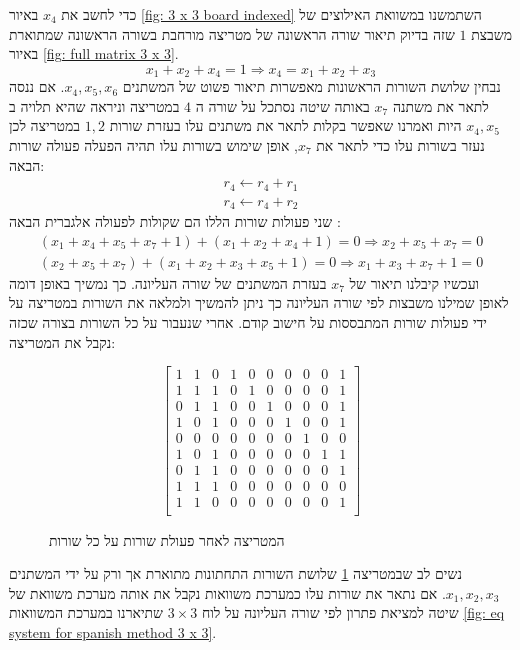 \documentclass[12pt,leqno]{article}
\begin{document}
כדי לחשב את 
$x_4$
באיור
\ref{fig: 3 x 3 board indexed}
השתמשנו במשוואת האילוצים של 
משבצת 
$1$
שזה בדיוק תיאור
שורה הראשונה של 
מטריצה מורחבת 
בשורה הראשונה
שמתוארת
באיור 
\ref{fig: full matrix 3 x 3}.
\[
    x_1 + x_2 + x_4 = 1 \Rightarrow x_4 = x_1 + x_2 + x_3
\]
נבחין שלושת השורות הראשונות  
מאפשרות תיאור פשוט של המשתנים 
$x_4, x_5, x_6$.
אם ננסה לתאר 
את משתנה 
$x_7$
באותה שיטה 
נסתכל על שורה ה 
$4$
במטריצה 
וניראה שהיא תלויה ב
$x_4, x_5$
היות ואמרנו
שאפשר בקלות לתאר את משתנים עלו 
בעזרת שורות 
$1,2$
במטריצה לכן 
נעזר בשורות עלו כדי לתאר את 
$x_7$,
אופן שימוש בשורות עלו תהיה 
הפעלה פעולה שורות הבאה:
\begin{align*}
    r_4 \leftarrow r_4 + r_1
    \\
    r_4 \leftarrow r_4 + r_2
\end{align*}
שני פעולות שורות הללו הם שקולות לפעולה אלגברית הבאה
:
\begin{align*}
   (x_1 + x_4 + x_5 + x_7 + 1) + (x_1 + x_2 + x_4 + 1) = 0 \Rightarrow x_2 + x_5 + x_7 = 0
    \\
    (x_2 + x_5 + x_7) + (x_1 + x_2 + x_3 + x_5 + 1 ) = 0 \Rightarrow x_1 + x_3 + x_7 + 1 = 0
\end{align*}
ועכשיו קיבלנו תיאור 
של 
$x_7$
בעזרת המשתנים של שורה העליונה.
כך נמשיך באופן דומה לאופן שמילנו משבצות לפי שורה העליונה כך ניתן 
להמשיך ולמלאה את השורות במטריצה על ידי פעולות שורות המתבססות על 
חישוב קודם.
אחרי שנעבור על כל השורות בצורה שכזה נקבל את המטריצה:
\begin{figure}
    \caption{המטריצה לאחר פעולת שורות על כל שורות}
    \label{fig: matrix after spanish}
    \begin{english}
        \begin{center}
            \[
                \left[
                \begin{array}{ccccccccc|c}
                1& 1& 0& 1& 0& 0& 0& 0& 0& 1 \\
                1& 1& 1& 0& 1& 0& 0& 0& 0& 1 \\
                0& 1& 1& 0& 0& 1& 0& 0& 0& 1 \\
                1& 0& 1& 0& 0& 0& 1& 0& 0& 1\\
                0& 0& 0& 0& 0& 0& 0& 1& 0& 0\\
                1& 0& 1& 0& 0& 0& 0& 0& 1& 1\\
                0& 1& 1& 0& 0& 0& 0& 0& 0& 1\\
                1& 1& 1& 0& 0& 0& 0& 0& 0& 0\\
                1& 1& 0& 0& 0& 0& 0& 0& 0& 1\\
            \end{array}
            \right]
            \]
        \end{center}       
    \end{english}
\end{figure}
נשים לב שבמטריצה 
\ref{fig: matrix after spanish}
שלושת השורות התחתונות מתוארת אך ורק על 
ידי 
המשתנים 
$x_1, x_2, x_3$.
אם נתאר את שורות עלו כמערכת משוואות נקבל
את אותה מערכת משוואת של 
שיטה למציאת פתרון לפי שורה העליונה על לוח 
$3 \times 3$
שתיארנו במערכת המשוואות
\ref{fig: eq system for spanish method 3 x 3}.
\end{document}
